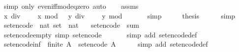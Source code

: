 \begin{isabellebody}
\ {\isacharparenleft}simp\ only{\isacharcolon}\ even{\isacharunderscore}iff{\isacharunderscore}mod{\isacharunderscore}{}{\isacharunderscore}eq{\isacharunderscore}zero{\isacharparenright}\ auto\isanewline
\ \ \isamarkupfalse%
\ assms\ \isamarkupfalse%
\ {\isachardoublequoteopen}x\ div\ {}\ {\isacharasterisk}\ {}\ {\isacharplus}\ x\ mod\ {}\ {\isacharequal}\ y\ div\ {}\ {\isacharasterisk}\ {}\ {\isacharplus}\ y\ mod\ {}{\isachardoublequoteclose}\isanewline
\ \ \ \ \isamarkupfalse%
\ simp\isanewline
\ \ \isamarkupfalse%
\ \isamarkupfalse%
\ {\isacharquery}thesis\isanewline
\ \ \ \ \isamarkupfalse%
\ simp\isanewline
{}\isamarkupfalse%
%
\endisatagproof
{\isafoldproof}%
%
\isadelimproof
%
\endisadelimproof
%
\isadelimdocument
%
\endisadelimdocument
%
\isatagdocument
%
\isamarkuptrue%
%
\endisatagdocument
{\isafolddocument}%
%
\isadelimdocument
%
\endisadelimdocument
{}\isamarkupfalse%
\ set{\isacharunderscore}encode\ {\isacharcolon}{\isacharcolon}\ {\isachardoublequoteopen}nat\ set\ {\isasymRightarrow}\ nat{\isachardoublequoteclose}\isanewline
\ \ \ {\isachardoublequoteopen}set{\isacharunderscore}encode\ {\isacharequal}\ sum\ {\isacharparenleft}{\isacharparenleft}{\isacharcircum}{\isacharparenright}\ {}{\isacharparenright}{\isachardoublequoteclose}\isanewline
\isanewline
{}\isamarkupfalse%
\ set{\isacharunderscore}encode{\isacharunderscore}empty\ {\isacharbrackleft}simp{\isacharbrackright}{\isacharcolon}\ {\isachardoublequoteopen}set{\isacharunderscore}encode\ {\isacharbraceleft}{\isacharbraceright}\ {\isacharequal}\ {}{\isachardoublequoteclose}\isanewline
%
\isadelimproof
\ \ %
\endisadelimproof
%
\isatagproof
{}\isamarkupfalse%
\ {\isacharparenleft}simp\ add{\isacharcolon}\ set{\isacharunderscore}encode{\isacharunderscore}def{\isacharparenright}%
\endisatagproof
{\isafoldproof}%
%
\isadelimproof
\isanewline
%
\endisadelimproof
\isanewline
{}\isamarkupfalse%
\ set{\isacharunderscore}encode{\isacharunderscore}inf{\isacharcolon}\ {\isachardoublequoteopen}{\isasymnot}\ finite\ A\ {\isasymLongrightarrow}\ set{\isacharunderscore}encode\ A\ {\isacharequal}\ {}{\isachardoublequoteclose}\isanewline
%
\isadelimproof
\ \ %
\endisadelimproof
%
\isatagproof
{}\isamarkupfalse%
\ {\isacharparenleft}simp\ add{\isacharcolon}\ set{\isacharunderscore}encode{\isacharunderscore}def{\isacharparenright}%

\end{isabellebody}
